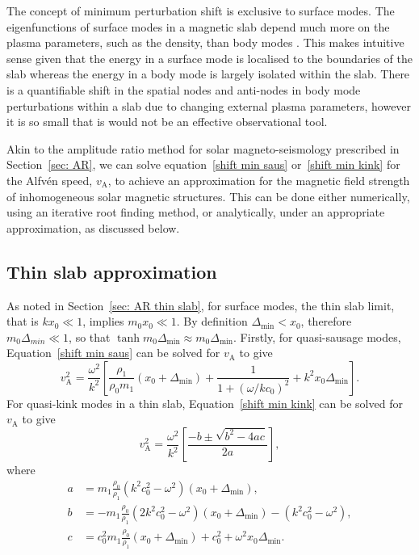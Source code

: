 \documentclass[namedreferences]{solarphysics}
\numberwithin{equation}{section}
\begin{document}
\begin{article}
The concept of minimum perturbation shift is exclusive to surface modes. The eigenfunctions of surface modes in a magnetic slab depend much more on the plasma parameters, such as the density, than body modes \citep{all_etal17}. This makes intuitive sense given that the energy in a surface mode is localised to the boundaries of the slab whereas the energy in a body mode is largely isolated within the slab. There is a quantifiable shift in the spatial nodes and anti-nodes in body mode perturbations within a slab due to changing external plasma parameters, however it is so small that is would not be an effective observational tool.

Akin to the amplitude ratio method for solar magneto-seismology prescribed in Section~\ref{sec: AR}, we can solve equation~\eqref{shift min saus} or~\eqref{shift min kink} for the Alfv\'{e}n speed, $v_\textrm{A}$, to achieve an approximation for the magnetic field strength of inhomogeneous solar magnetic structures. This can be done either numerically, using an iterative root finding method, or analytically, under an appropriate approximation, as discussed below.


\subsection{Thin slab approximation}
As noted in Section~\ref{sec: AR thin slab}, for surface modes, the thin slab limit, that is $kx_0 \ll 1$, implies $m_0x_0 \ll 1$. By definition $\Delta_\textrm{min} < x_0$, therefore $m_0\Delta_{min} \ll 1$, so that $\tanh{m_0\Delta_\textrm{min}} \approx m_0\Delta_\textrm{min}$. Firstly, for quasi-sausage modes, Equation~\eqref{shift min saus} can be solved for $v_\textrm{A}$ to give
\begin{equation}
v_\textrm{A}^2 = \frac{\omega^2}{k^2} \left[\frac{\rho_1}{\rho_0m_1}(x_0 + \Delta_\textrm{min}) + \frac{1}{1 + (\omega / kc_0)^2} + k^2x_0\Delta_\textrm{min}\right].
\end{equation}
For quasi-kink modes in a thin slab, Equation~\eqref{shift min kink} can be solved for $v_\textrm{A}$ to give
\begin{equation}
v_\textrm{A}^2 = \frac{\omega^2}{k^2}\left[\frac{-b \pm \sqrt{b^2 - 4ac}}{2a}\right],
\end{equation}
where
\begin{align}
a &= m_1\frac{\rho_0}{\rho_1}(k^2c_0^2 - \omega^2)(x_0 + \Delta_\textrm{min}), \\
b &= -m_1\frac{\rho_0}{\rho_1}(2k^2c_0^2 - \omega^2)(x_0 + \Delta_\textrm{min}) - (k^2c_0^2 - \omega^2), \\
c &= c_0^2m_1\frac{\rho_0}{\rho_1}(x_0 + \Delta_\textrm{min}) + c_0^2 + \omega^2x_0\Delta_\textrm{min}.
\end{align}



\end{article}
\end{document}
